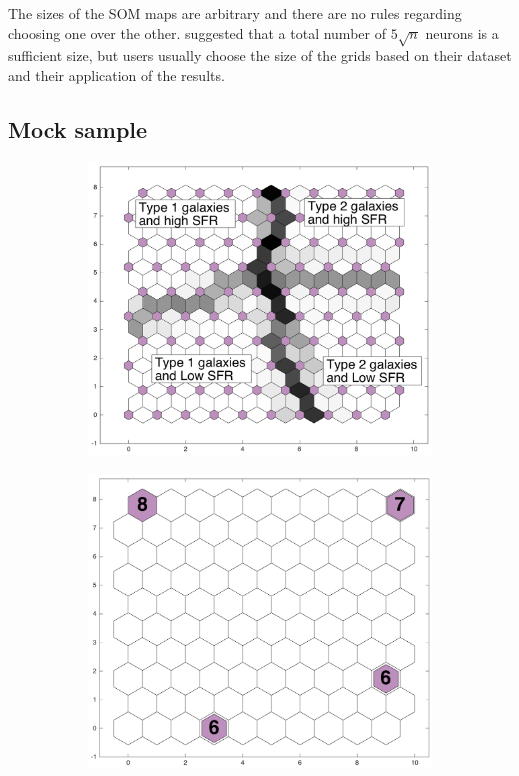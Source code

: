     The sizes of the SOM maps are arbitrary and there are no rules regarding choosing one over the other. 
    \citet{Vesanto05} suggested that a total number of $5\sqrt{n}$ neurons is a sufficient size, but users usually choose the size of the grids based on their dataset and their application of the results.

   
\subsection{Mock sample}
 
         \begin{figure}
            \begin{subfigure}[b]{0.5\textwidth}
                \centering
                \includegraphics[width=\textwidth]{../image_paper2/sample/sample2_dist.png}
            \end{subfigure}
            \hfill
            \begin{subfigure}[b]{0.5\textwidth}
                \includegraphics[width=\textwidth]{../image_paper2/sample/sample2_hits.png}

\end{subfigure}
\end{figure}
